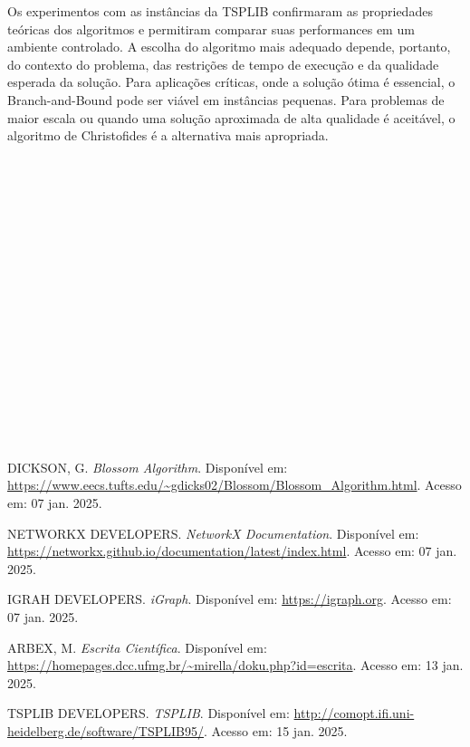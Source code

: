 \documentclass[12pt]{article}
\begin{document}
Os experimentos com as instâncias da TSPLIB confirmaram as propriedades teóricas dos algoritmos e permitiram comparar suas performances em um ambiente controlado. A escolha do algoritmo mais adequado depende, portanto, do contexto do problema, das restrições de tempo de execução e da qualidade esperada da solução. Para aplicações críticas, onde a solução ótima é essencial, o Branch-and-Bound pode ser viável em instâncias pequenas. Para problemas de maior escala ou quando uma solução aproximada de alta qualidade é aceitável, o algoritmo de Christofides é a alternativa mais apropriada.
\\
\\
\\
\\
\\
\\
\\
\\
\\
\\
\\
\\
\\
\\
\\
\\
\\
\\


\begin{thebibliography}{99}

DICKSON, G. \textit{Blossom Algorithm}. Disponível em: \url{https://www.eecs.tufts.edu/~gdicks02/Blossom/Blossom_Algorithm.html}. Acesso em: 07 jan. 2025.

NETWORKX DEVELOPERS. \textit{NetworkX Documentation}. Disponível em: \url{https://networkx.github.io/documentation/latest/index.html}. Acesso em: 07 jan. 2025.

IGRAH DEVELOPERS. \textit{iGraph}. Disponível em: \url{https://igraph.org}. Acesso em: 07 jan. 2025.

ARBEX, M. \textit{Escrita Científica}. Disponível em: \url{https://homepages.dcc.ufmg.br/~mirella/doku.php?id=escrita}. Acesso em: 13 jan. 2025.

TSPLIB DEVELOPERS. \textit{TSPLIB}. Disponível em: \url{http://comopt.ifi.uni-heidelberg.de/software/TSPLIB95/}. Acesso em: 15 jan. 2025.

\end{thebibliography}
\end{document}
